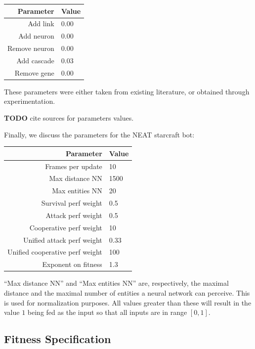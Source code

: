 \begin{tabular}{rl}
    \toprule
    Parameter & Value \\
    \midrule
    Add link & 0.00 \\
    Add neuron & 0.00 \\
    Remove neuron & 0.00 \\
    Add cascade & 0.03 \\
    Remove gene & 0.00 \\
    \bottomrule
\end{tabular}

These parameters were either taken from existing literature, or
obtained through experimentation.

{\bf TODO} cite sources for parameters values.


Finally, we discuss the parameters for the NEAT starcraft bot:

\begin{tabular}{rl}
    \toprule
    Parameter & Value \\
    \midrule
    Frames per update & 10 \\
    Max distance NN & 1500 \\
    Max entities NN  & 20 \\[1ex]

    Survival perf weight & 0.5 \\
    Attack perf weight  & 0.5 \\
    Cooperative perf weight & 10 \\
    Unified attack perf weight & 0.33 \\
    Unified cooperative perf weight & 100 \\
    Exponent on fitness & 1.3 \\
    \bottomrule
\end{tabular}

``Max distance NN'' and ``Max entities NN'' are, respectively, the
maximal distance and the maximal number of entities a neural network
can perceive.  This is used for normalization purposes. All values
greater than these will result in the value \(1\) being fed as the
input so that all inputs are in range \([0, 1]\).

\subsection{Fitness Specification}

